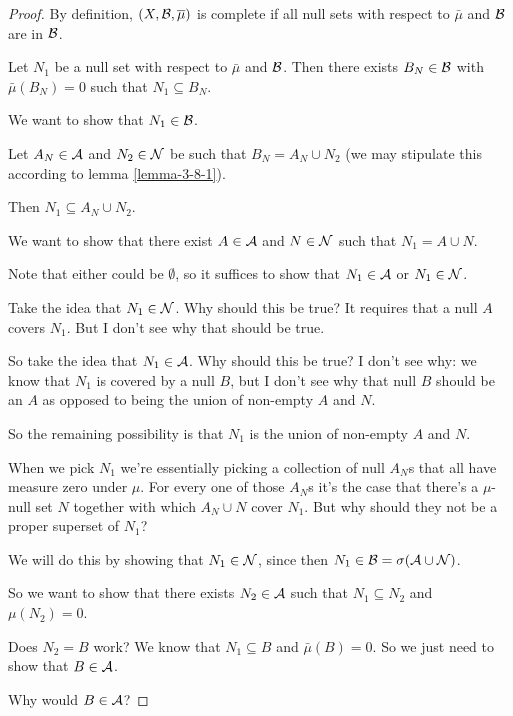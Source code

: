\begin{proof}
  By definition, $(X, \mathcal B, \overline{\mu})$ is complete if all null sets with respect to $\bar\mu$ and $\mathcal B$ are
  in $\mathcal B$.

  Let $N_1$ be a null set with respect to $\bar\mu$ and $\mathcal B$. Then there exists $B_N \in \mathcal B$
  with $\bar\mu(B_N) = 0$ such that $N_1 \subseteq B_N$.

  We want to show that $N_1 \in \mathcal B$.

  Let $A_N \in \mathcal A$ and $N_2 \in \mathcal N$ be such that $B_N = A_N \cup N_2$ (we may stipulate this according to
  lemma \eqref{lemma-3-8-1}).

  Then $N_1 \subseteq A_N \cup N_2$.

  We want to show that there exist $A \in \mathcal A$ and $N \in \mathcal N$ such that $N_1 = A \cup N$.

  Note that either could be $\emptyset$, so it suffices to show that $N_1 \in \mathcal A$ or $N_1 \in \mathcal N$.

  Take the idea that $N_1 \in \mathcal N$. Why should this be true? It requires that a null $A$ covers $N_1$. But I
  don't see why that should be true.

  So take the idea that $N_1 \in \mathcal A$. Why should this be true? I don't see why: we know that $N_1$ is
  covered by a null $B$, but I don't see why that null $B$ should be an $A$ as opposed to being the union of
  non-empty $A$ and $N$.

  So the remaining possibility is that $N_1$ is the union of non-empty $A$ and $N$.

  When we pick $N_1$ we're essentially picking a collection of null $A_N$s that all have measure zero
  under $\mu$. For every one of those $A_N$s it's the case that there's a $\mu$-null set $N$ together with
  which $A_N \cup N$ cover $N_1$. But why should they not be a proper superset of $N_1$?







  We will do this by showing that $N_1 \in \mathcal N$, since then $N_1 \in \mathcal B = \sigma(\mathcal A \cup \mathcal N)$.

  So we want to show that there exists $N_2 \in \mathcal A$ such that $N_1 \subseteq N_2$ and $\mu(N_2) = 0$.

  Does $N_2 = B$ work? We know that $N_1 \subseteq B$ and $\bar\mu(B) = 0$. So we just need to show that $B \in \mathcal A$.

  Why would $B \in \mathcal A$?


\end{proof}
